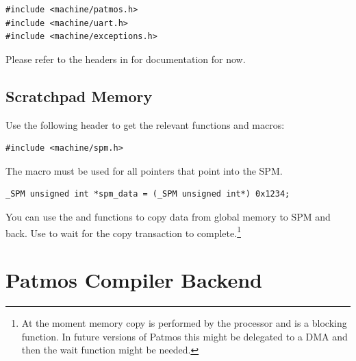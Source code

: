 \begin{verbatim}
#include <machine/patmos.h>
#include <machine/uart.h>
#include <machine/exceptions.h>
\end{verbatim}

Please refer to the headers in  for documentation for now.


\subsection{Scratchpad Memory}

Use the following header to get the relevant functions and macros:

\begin{verbatim}
#include <machine/spm.h>
\end{verbatim}

The  macro must be used for all pointers that point into the SPM.

\begin{verbatim}
_SPM unsigned int *spm_data = (_SPM unsigned int*) 0x1234;
\end{verbatim}

You can use the  and  functions
to copy data from global memory to SPM and back. Use  to
wait for the copy transaction to complete.\footnote{At the moment memory copy is
performed by the processor and is a blocking function. In future versions of Patmos
this might be delegated to a DMA and then the wait function might be needed.}





%



\section{Patmos Compiler Backend}
\label{sec:toolchain:backend}

